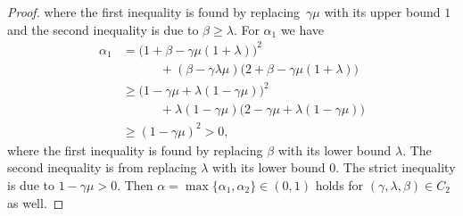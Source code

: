 \documentclass[9pt,shortpaper,twoside,web]{ieeecolor}
\begin{document}
\begin{proof}
    where the first inequality is found by replacing~$\gamma\mu$ with its upper bound $1$ and 
    the second inequality is due to $\beta\geq\lambda$.
    For $\alpha_1$ we have
    \begin{align}
        \alpha_1 &=\big(1+\beta-\gamma\mu(1+\lambda)\big)^2
        \\ &\quad\quad\quad + (\beta-\gamma\lambda\mu)\big(2+\beta-\gamma\mu(1+\lambda)\big)
        \\ &\geq \big(1 -\gamma\mu + \lambda(1-\gamma\mu)\big)^2
        \\ &\quad\quad\quad + \lambda(1-\gamma\mu)\big(2-\gamma\mu+\lambda(1-\gamma\mu)\big)
        \\ &\geq (1-\gamma\mu)^2 >0,
    \end{align}
    where the first inequality is found by replacing $\beta$ with its lower bound $\lambda$. 
    The second inequality is from replacing $\lambda$ with its lower bound $0$.
    The strict inequality is due to $1-\gamma\mu>0$.
    Then $\alpha=\max\{\alpha_1,\alpha_2\}\in(0,1)$ holds for $(\gamma,\lambda,\beta)\in C_2$
    as well. 
    \end{proof}
\end{document}

